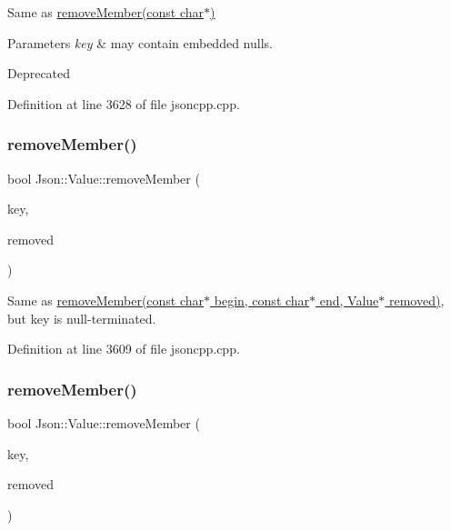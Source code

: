Same as \hyperlink{class_json_1_1_value_aa52f7873b95d29627d6e83ba96f69aaa}{remove\+Member(const char$\ast$)} 
\begin{DoxyParams}{Parameters}
{\em key} & may contain embedded nulls. \\
\hline
\end{DoxyParams}
\begin{DoxyRefDesc}{Deprecated}
\item[\hyperlink{deprecated__deprecated000002}{Deprecated}]\end{DoxyRefDesc}


Definition at line 3628 of file jsoncpp.\+cpp.

\hypertarget{class_json_1_1_value_a708e599489adf30d65bf85a8ee16e6fb}{}\label{class_json_1_1_value_a708e599489adf30d65bf85a8ee16e6fb} 
\subsubsection{\texorpdfstring{remove\+Member()}{removeMember()}\hspace{0.1cm}{\footnotesize\ttfamily [8/10]}}
{\footnotesize\ttfamily bool Json\+::\+Value\+::remove\+Member (\begin{DoxyParamCaption}\item[{const char $\ast$}]{key,  }\item[{\hyperlink{class_json_1_1_value}{Value} $\ast$}]{removed }\end{DoxyParamCaption})}

Same as \hyperlink{class_json_1_1_value_a49c91af727d6b4eb0af02a81bb2def87}{remove\+Member(const char$\ast$ begin, const char$\ast$ end, Value$\ast$ removed)}, but \textquotesingle{}key\textquotesingle{} is null-\/terminated. 

Definition at line 3609 of file jsoncpp.\+cpp.

\hypertarget{class_json_1_1_value_ae385ecef98427970df525ee876e9f54a}{}\label{class_json_1_1_value_ae385ecef98427970df525ee876e9f54a} 
\subsubsection{\texorpdfstring{remove\+Member()}{removeMember()}\hspace{0.1cm}{\footnotesize\ttfamily [9/10]}}
{\footnotesize\ttfamily bool Json\+::\+Value\+::remove\+Member (\begin{DoxyParamCaption}\item[{\hyperlink{config_8h_a1e723f95759de062585bc4a8fd3fa4be}{J\+S\+O\+N\+C\+P\+P\+\_\+\+S\+T\+R\+I\+NG} const \&}]{key,  }\item[{\hyperlink{class_json_1_1_value}{Value} $\ast$}]{removed }\end{DoxyParamCaption})}



